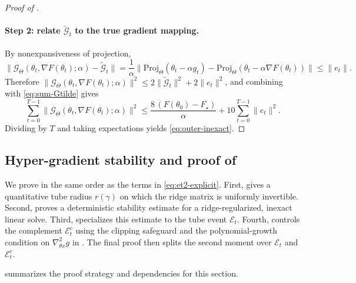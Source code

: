 \documentclass{article}
\theoremstyle{normaltheorem}
\begin{document}
\begin{proof}[Proof of ]
\paragraph{Step 2: relate $\widetilde{\mathcal G}_t$ to the true gradient mapping.}
By nonexpansiveness of projection,
\[
\|\mathcal G_{\Theta}(\theta_t,\nabla F(\theta_t);\alpha)-\widetilde{\mathcal G}_t\|
=
\frac{1}{\alpha}\big\|\mathrm{Proj}_{\Theta}(\theta_t-\alpha g_t)-\mathrm{Proj}_{\Theta}(\theta_t-\alpha\nabla F(\theta_t))\big\|
\le \|e_t\|.
\]
Therefore $\|\mathcal G_{\Theta}(\theta_t,\nabla F(\theta_t);\alpha)\|^2\le 2\|\widetilde{\mathcal G}_t\|^2+2\|e_t\|^2$,
and combining with \eqref{eq:sum-Gtilde} gives
\[
\sum_{t=0}^{T-1}\|\mathcal G_{\Theta}(\theta_t,\nabla F(\theta_t);\alpha)\|^2
\le
\frac{8\,(F(\theta_0)-F_\star)}{\alpha}
+10\sum_{t=0}^{T-1}\|e_t\|^2.
\]
Dividing by $T$ and taking expectations yields \eqref{eq:outer-inexact}.
\end{proof}


\subsection[Hyper-gradient stability]{Hyper-gradient stability and proof of }\label{append:hg-stability}

\begin{figure}[omitted: a diagram of this paper's results, not reproduced here]\label{fig:appendix-d-hg-flow}\end{figure}

We prove  in the same order as the terms in \eqref{eq:et2-explicit}.
First,  gives a quantitative tube radius \(r(\gamma)\) on which the ridge matrix is uniformly invertible.
Second,  proves a deterministic stability estimate for a ridge-regularized, inexact linear solve.
Third,  specializes this estimate to the tube event \(\mathcal E_t\).
Fourth,  controls the complement \(\mathcal E_t^c\) using the clipping safeguard and the
polynomial-growth condition on \(\nabla^2_{\theta x}g\) in .
The final proof then splits the second moment over \(\mathcal E_t\) and \(\mathcal E_t^c\).

 summarizes the proof strategy and dependencies for this section.
\end{document}
